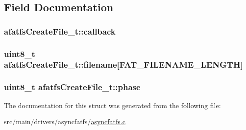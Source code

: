 \subsection{Field Documentation}
\hypertarget{structafatfsCreateFile__t_a3873f06044c56d0bbc1156d2a4c2ab88}{
\subsubsection[{callback}]{ afatfs\+Create\+File\+\_\+t\+::callback}}\label{structafatfsCreateFile__t_a3873f06044c56d0bbc1156d2a4c2ab88}
\hypertarget{structafatfsCreateFile__t_afdc6a31b8bd2de176205ad456861fd07}{
\subsubsection[{filename}]{\setlength{\rightskip}{0pt plus 5cm}uint8\+\_\+t afatfs\+Create\+File\+\_\+t\+::filename\mbox{[}{\bf F\+A\+T\+\_\+\+F\+I\+L\+E\+N\+A\+M\+E\+\_\+\+L\+E\+N\+G\+T\+H}\mbox{]}}}\label{structafatfsCreateFile__t_afdc6a31b8bd2de176205ad456861fd07}
\hypertarget{structafatfsCreateFile__t_a7909c269ae51e220a400949c7256fcc3}{
\subsubsection[{phase}]{\setlength{\rightskip}{0pt plus 5cm}uint8\+\_\+t afatfs\+Create\+File\+\_\+t\+::phase}}\label{structafatfsCreateFile__t_a7909c269ae51e220a400949c7256fcc3}


The documentation for this struct was generated from the following file\+:\begin{DoxyCompactItemize}
\item 
src/main/drivers/asyncfatfs/\hyperlink{asyncfatfs_8c}{asyncfatfs.\+c}\end{DoxyCompactItemize}
